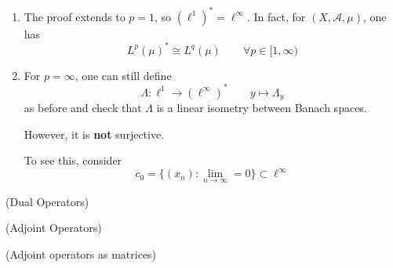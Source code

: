 \documentclass{article}
\begin{document}
\begin{remark}
    \begin{enumerate}[1)]
        \item The proof extends to $p=1$, so $(\ell^1)^* = \ell^{\infty}$. In fact, for $(X, \mathcal{A}, \mu)$, one has  
        $$L^p(\mu)^* \cong L^q(\mu) \qquad \forall p \in [1, \infty)$$
        \item For $p=\infty$, one can still define  
        $$\Lambda: \ell^1 \to (\ell^{\infty})^* \qquad y \mapsto \Lambda_y$$
        as before and check that $\Lambda$ is a linear isometry between Banach spaces.
        
        However, it is \textbf{not} surjective.  
        
        To see this, consider 
        $$c_0 = \{(x_n): \lim_{n \to \infty} = 0\} \subset \ell^{\infty}$$
    \end{enumerate}
\end{remark}  



\begin{definition}
    (Dual Operators)
\end{definition}  

\begin{definition}
    (Adjoint Operators)
\end{definition}    

\begin{example}
    (Adjoint operators as matrices)
\end{example}  

\begin{remark}
    
\end{remark}
\end{document}
